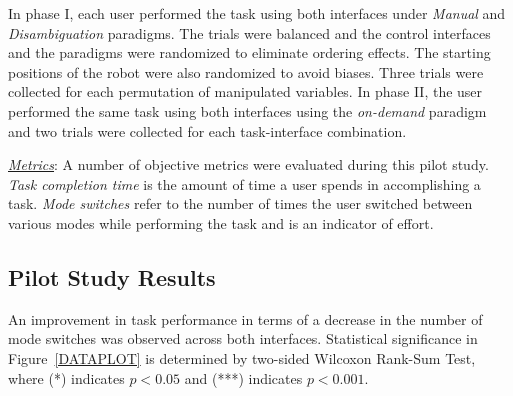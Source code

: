 \documentclass[conference]{IEEEtran}
\begin{document}
In phase I, each user performed the task using both interfaces under \textit{Manual} and \textit{Disambiguation} paradigms. The trials were balanced and the control interfaces and the paradigms were randomized to eliminate ordering effects. The starting positions of the robot were also randomized to avoid biases. Three trials were collected for each permutation of manipulated variables. 
In phase II, the user performed the same task using both interfaces using the \textit{on-demand} paradigm and two trials were collected for each task-interface combination.  

\noindent\underline{\textit{Metrics}}: A number of objective metrics were evaluated during this pilot study. \textit{Task completion time} is the amount of time a user spends in accomplishing a task. \textit{Mode switches} refer to the number of times the user switched between various modes while performing the task and is an indicator of effort. 


\subsection{Pilot Study Results}\label{RES}
An improvement in task performance in terms of a decrease in the number of mode switches was observed across both interfaces. Statistical significance in Figure~\ref{DATAPLOT} is determined by two-sided Wilcoxon Rank-Sum Test, where (*) indicates $p < 0.05$ and (***) indicates $p < 0.001$.
\end{document}

